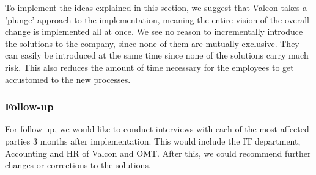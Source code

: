 To implement the ideas explained in this section, we suggest that Valcon takes a 'plunge' approach to the implementation, meaning the entire vision of the overall change is implemented all at once.
We see no reason to incrementally introduce the solutions to the company, since none of them are mutually exclusive. 
They can easily be introduced at the same time since none of the solutions carry much risk.
This also reduces the amount of time necessary for the employees to get accustomed to the new processes.

\subsubsection{Follow-up}
For follow-up, we would like to conduct interviews with each of the most affected parties 3 months after implementation.
This would include the IT department, Accounting and HR of Valcon and OMT.
After this, we could recommend further changes or corrections to the solutions. 
